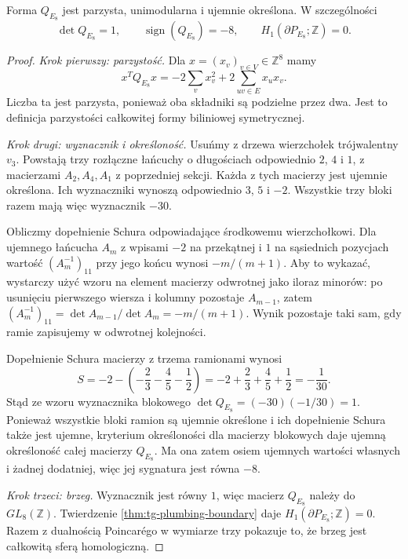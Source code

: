 \begin{twierdzenie}
\label{thm:tg-E8-unimodular}
Forma $Q_{E_8}$ jest parzysta, unimodularna i ujemnie
określona. W szczególności
\[
\det Q_{E_8}=1,\qquad \operatorname{sign}(Q_{E_8})=-8,
\qquad H_1(\partial P_{E_8};\mathbb Z)=0.
\]
\end{twierdzenie}

\begin{proof}
\emph{Krok pierwszy: parzystość.}
Dla $x=(x_v)_{v\in V}\in\mathbb Z^8$ mamy
\[
x^TQ_{E_8}x=-2\sum_vx_v^2+2\sum_{uv\in E}x_ux_v.
\]
Liczba ta jest parzysta, ponieważ oba składniki są
podzielne przez dwa. Jest to definicja parzystości
całkowitej formy biliniowej symetrycznej.

\emph{Krok drugi: wyznacznik i określoność.}
Usuńmy z drzewa wierzchołek trójwalentny $v_3$.
Powstają trzy rozłączne łańcuchy o długościach odpowiednio
$2$, $4$ i $1$, z macierzami $A_2,A_4,A_1$ z poprzedniej
sekcji. Każda z tych macierzy jest ujemnie określona.
Ich wyznaczniki wynoszą odpowiednio $3$, $5$ i $-2$.
Wszystkie trzy bloki razem mają więc wyznacznik $-30$.

Obliczmy dopełnienie Schura odpowiadające środkowemu
wierzchołkowi. Dla ujemnego łańcucha $A_m$ z
wpisami $-2$ na przekątnej i $1$ na sąsiednich
pozycjach wartość $(A_m^{-1})_{11}$ przy jego końcu
wynosi $-m/(m+1)$. Aby to wykazać, wystarczy użyć
wzoru na element macierzy odwrotnej jako iloraz
minorów: po usunięciu pierwszego wiersza i kolumny
pozostaje $A_{m-1}$, zatem
$(A_m^{-1})_{11}=\det A_{m-1}/\det A_m=-m/(m+1)$.
Wynik pozostaje taki sam, gdy ramie zapisujemy w
odwrotnej kolejności.

Dopełnienie Schura macierzy z trzema ramionami wynosi
\[
S=-2-\left(-\frac23-\frac45-\frac12\right)
=-2+\frac23+\frac45+\frac12=-\frac1{30}.
\]
Stąd ze wzoru wyznacznika blokowego
$\det Q_{E_8}=(-30)(-1/30)=1$. Ponieważ wszystkie
bloki ramion są ujemnie określone i ich dopełnienie
Schura także jest ujemne, kryterium określoności
dla macierzy blokowych daje ujemną określoność
całej macierzy $Q_{E_8}$. Ma ona zatem osiem
ujemnych wartości własnych i żadnej dodatniej,
więc jej sygnatura jest równa $-8$.

\emph{Krok trzeci: brzeg.}
Wyznacznik jest równy $1$, więc macierz $Q_{E_8}$
należy do $GL_8(\mathbb Z)$. Twierdzenie
\ref{thm:tg-plumbing-boundary} daje
$H_1(\partial P_{E_8};\mathbb Z)=0$.
Razem z dualnością Poincarégo w wymiarze trzy
pokazuje to, że brzeg jest całkowitą sferą homologiczną.
\end{proof}

